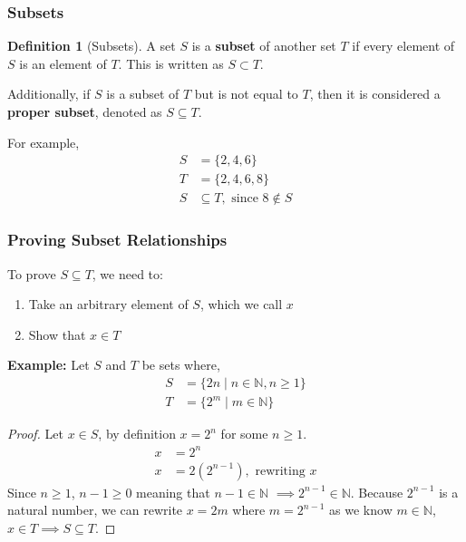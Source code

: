 \documentclass[12pt]{article}
\newcommand{\N}{\mathbb{N}}
\theoremstyle{definition}
\newtheorem{definition}{Definition}
\begin{document}
            
            \subsubsection{Subsets}
            \begin{definition}[Subsets]
                \label{def:subset}
                A set $S$ is a \textbf{subset} of another set $T$ if every element of $S$ is an element of $T$. This
                is written as $S \subset T$.
            \end{definition}

            Additionally, if $S$ is a subset of $T$ but is not equal to $T$, then it is considered a \textbf{proper subset},
            denoted as $S \subseteq T$.
            
            For example,
            \begin{align*}
                S &= \{2,4,6\} \\
                T &= \{2,4,6,8\}\\
                S &\subseteq T, \text{ since $8 \notin S$}
            \end{align*}


            \subsubsection{Proving Subset Relationships}
            To prove $S \subseteq T$, we need to:
            \begin{enumerate}
                \item Take an arbitrary element of $S$, which we  call $x$
                \item Show that $x \in T$ \\
            \end{enumerate}

            \textbf{Example:} Let $S$ and $T$ be sets where,
            \begin{align*}
                S &= \{2n \mid n \in \N, n \ge 1\} \\
                T &= \{2^{m} \mid m \in \N\}
            \end{align*}
            \begin{proof}
                Let $x \in S$, by definition $x=2^n$ for some $n \ge 1$.
                \begin{align*}
                    x &=2^n \\
                    x &=2(2^{n-1}), \text{ rewriting $x$}
                \end{align*}
                Since $n \ge 1$, $n-1 \ge 0$ meaning that $n-1 \in \N$ $\implies 2^{n-1} \in \N$.
                Because $2^{n-1}$ is a natural number, we can rewrite $x = 2m$ where $m=2^{n-1}$ as we know
                $m \in \N$, $x \in T \implies S \subseteq T$.
            \end{proof}
\end{document}
